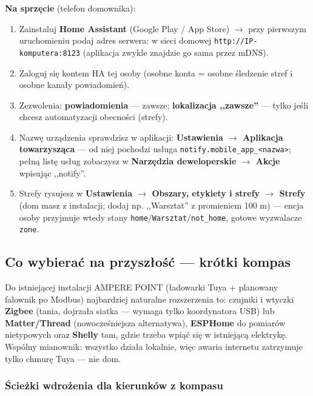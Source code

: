 \documentclass[11pt,a4paper]{article}
\begin{document}
\textbf{Na sprzęcie} (telefon domownika):
\begin{enumerate}
\item Zainstaluj \textbf{Home Assistant} (Google Play / App Store) $\to$ przy pierwszym uruchomieniu podaj adres serwera: w sieci domowej \texttt{http://IP-komputera:8123} (aplikacja zwykle znajdzie go sama przez mDNS).
\item Zaloguj się kontem HA tej osoby (osobne konta = osobne śledzenie stref i osobne kanały powiadomień).
\item Zezwolenia: \textbf{powiadomienia} --- zawsze; \textbf{lokalizacja ,,zawsze''} --- tylko jeśli chcesz automatyzacji obecności (strefy). 
\item Nazwę urządzenia sprawdzisz w aplikacji: \textbf{Ustawienia $\to$ Aplikacja towarzysząca} --- od niej pochodzi usługa \texttt{notify.mobile\_app\_<nazwa>}; pełną listę usług zobaczysz w \textbf{Narzędzia deweloperskie $\to$ Akcje} wpisując ,,notify''.
\item Strefy rysujesz w \textbf{Ustawienia $\to$ Obszary, etykiety i strefy $\to$ Strefy} (dom masz z instalacji; dodaj np. ,,Warsztat'' z promieniem 100 m) --- encja osoby przyjmuje wtedy stany \texttt{home}/\texttt{Warsztat}/\texttt{not\_home}, gotowe wyzwalacze \texttt{zone}.
\end{enumerate}

\subsection{Co wybierać na przyszłość --- krótki kompas}

Do istniejącej instalacji AMPERE POINT (ładowarki Tuya + planowany falownik po Modbus) najbardziej naturalne rozszerzenia to: czujniki i wtyczki \textbf{Zigbee} (tania, dojrzała siatka --- wymaga tylko koordynatora USB) lub \textbf{Matter/Thread} (nowocześniejsza alternatywa), \textbf{ESPHome} do pomiarów nietypowych oraz \textbf{Shelly} tam, gdzie trzeba wpiąć się w istniejącą elektrykę. Wspólny mianownik: wszystko działa lokalnie, więc awaria internetu zatrzymuje tylko chmurę Tuya --- nie dom. 

\subsubsection{Ścieżki wdrożenia dla kierunków z kompasu}
\end{document}
